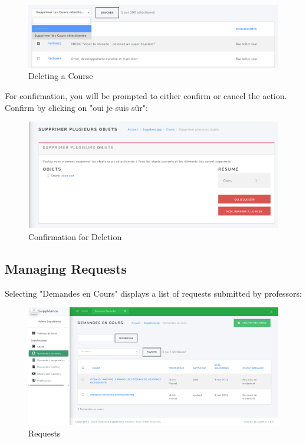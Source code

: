 \documentclass[12pt]{article}
\begin{document}
\begin{figure}[H]
    \centering
    \includegraphics[width=0.75\linewidth]{image26.png}
    \caption{Deleting a Course}
\end{figure}

For confirmation, you will be prompted to either confirm or cancel the action. Confirm by clicking on "oui je suis sûr":

\begin{figure}[H]
    \centering
    \includegraphics[width=0.75\linewidth]{image27.png}
    \caption{Confirmation for Deletion}
\end{figure}

\subsection{Managing Requests}

Selecting "Demandes en Cours" displays a list of requests submitted by professors:

\begin{figure}[H]
    \centering
    \includegraphics[width=0.75\linewidth]{image28.png}
    \caption{Requests}
\end{figure}
\end{document}
